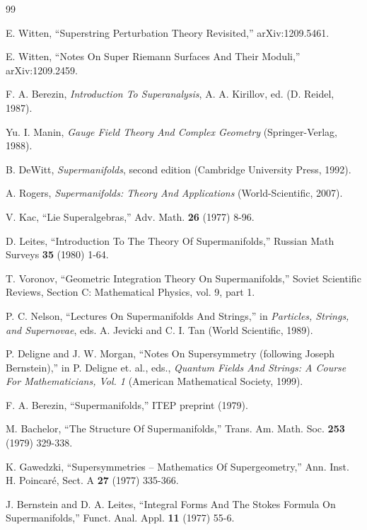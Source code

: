 \documentclass[11pt,a4paper]{article}
\begin{document}

\begin{thebibliography}{99}



E. Witten, ``Superstring Perturbation Theory Revisited,'' arXiv:1209.5461.

E. Witten, ``Notes On Super Riemann Surfaces And Their Moduli,'' arXiv:1209.2459.

F. A. Berezin, {\it Introduction To Superanalysis}, A. A. Kirillov, ed. (D. Reidel, 1987).

Yu. I. Manin, {\it Gauge Field Theory And Complex Geometry} (Springer-Verlag, 1988).




B. DeWitt, {\it Supermanifolds}, second edition (Cambridge University Press, 1992).


A. Rogers, {\it Supermanifolds: Theory And Applications} (World-Scientific, 2007).

V. Kac, ``Lie Superalgebras,'' Adv. Math. {\bf 26} (1977) 8-96.

D. Leites, ``Introduction To The Theory Of Supermanifolds,'' Russian Math Surveys {\bf 35} (1980) 1-64.

T. Voronov, ``Geometric Integration Theory On Supermanifolds,'' Soviet Scientific Reviews, Section C: Mathematical Physics, vol. 9, part 1.

P. C. Nelson, ``Lectures On Supermanifolds And Strings,'' in {\it Particles, Strings, and Supernovae}, eds. A. Jevicki and C. I. Tan (World Scientific, 1989).

 P. Deligne and J. W. Morgan, ``Notes On Supersymmetry (following Joseph Bernstein),'' in P. Deligne et. al., eds., {\it Quantum Fields
And Strings: A Course For Mathematicians, Vol. 1} (American Mathematical Society, 1999).

F. A. Berezin, ``Supermanifolds,'' ITEP preprint (1979).

M. Bachelor, ``The Structure Of Supermanifolds,'' Trans. Am. Math. Soc. {\bf 253} (1979) 329-338.

K. Gawedzki, ``Supersymmetries -- Mathematics Of Supergeometry,'' Ann. Inst. H. Poincar\'e, Sect. A {\bf 27} (1977) 335-366. 

J. Bernstein and D. A. Leites, ``Integral Forms And The Stokes Formula On Supermanifolds,'' Funct. Anal. Appl. {\bf 11} (1977) 55-6.


\end{thebibliography}
\end{document}

